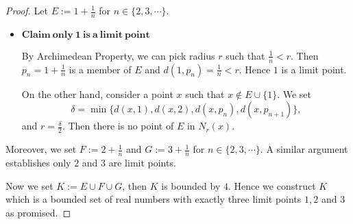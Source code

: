 \begin{Exercise}
\begin{proof}
Let $E := 1+\frac{1}{n}$ for $n\in \{2,3,\cdots\}$.
\begin{itemize}
\item $\mathbf{Claim\ only\ 1\ is\ a\ limit\ point}$

By Archimedean Property, we can pick radius $r$ such that $\frac{1}{n} < r$. Then $p_n = 1+\frac{1}{n}$ is a member of $E$ and $d(1, p_n) = \frac{1}{n} < r$. Hence $1$ is a limit point.

On the other hand, consider a point $x$ such that $x\notin E\cup \{1\}$. We set 
$$
\delta = \min\{d(x,1), d(x,2), d(x, p_n), d(x, p_{n+1})\},
$$
and $r = \frac{\delta}{2}$. Then there is no point of $E$ in $N_r(x)$.
\end{itemize}

Moreover, we set $F := 2+\frac{1}{n}$ and $G := 3+\frac{1}{n}$ for $n\in \{2,3,\cdots\}$. A similar argument establishes only $2$ and $3$ are limit points.

Now we set $K := E\cup F\cup G$, then $K$ is bounded by $4$. Hence we construct $K$ which is a bounded set of real numbers with exactly three limit points $1,2$ and $3$ as promised.
\end{proof}
\end{Exercise}